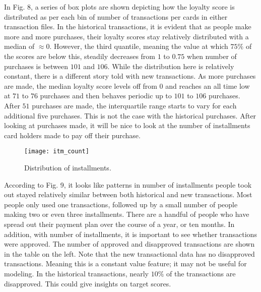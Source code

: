 \documentclass[journal, a4paper]{IEEEtran}
\begin{document}
In Fig. 8, a series of box plots are shown depicting how the loyalty score is distributed as per each bin of number of transactions per cards in either transaction files. In the historical transactions, it is evident that as people make more and more purchases, their loyalty scores stay relatively distributed with a median of $\approx 0$. However, the third quantile, meaning the value at which $75\%$ of the scores are below this, steadily decreases from $1$ to $0.75$ when number of purchases is between $101$ and $106$. While the distribution here is relatively constant, there is a different story told with new transactions. As more purchases are made, the median loyalty score levels off from $0$ and reaches an all time low at $71$ to $76$ purchases and then behaves periodic up to $101$ to $106$ purchases. After $51$ purchases are made, the interquartile range starts to vary for each additional five purchases. This is not the case with the historical purchases. After looking at purchases made, it will be nice to look at the number of installments card holders made to pay off their purchase. 
 \begin{figure}[t!] \texttt{[image: itm\_count]} \caption{Distribution of installments.} \end{figure} 
According to Fig. 9, it looks like patterns in number of installments people took out stayed relatively similar between both historical and new transactions. Most people only used one transactions, followed up by a small number of people making two or even three installments. There are a handful of people who have spread out their payment plan over the course of a year, or ten months. In addition, with number of installments,  it is important to see whether transactions were approved.  The number of approved and disapproved transactions are shown in the table on the left. Note that the new transactional data has no disapproved transactions. Meaning this is a constant value feature; it may not be useful for modeling. In the historical transactions, nearly $10\%$ of the transactions are disapproved. This could give insights on target scores. 
\end{document}

